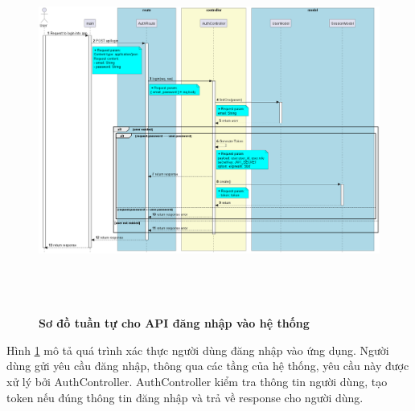 \begin{enumerate}[a)]
\begin{figure}[H]
  \centering
  \includegraphics[width=16cm,height=12cm]{Images/server/sequence/server/login.png}
  \caption[Sơ đồ tuần tự cho API đăng nhập vào hệ thống]{\bfseries \fontsize{12pt}{0pt}
  \selectfont Sơ đồ tuần tự cho API đăng nhập vào hệ thống }
  \label{backend_login} %
\end{figure}
Hình \ref{backend_login}  mô tả quá trình xác thực người dùng đăng nhập vào ứng dụng. Người dùng gửi yêu cầu đăng nhập, thông qua các tầng của hệ thống, yêu cầu này được xử lý bởi AuthController. AuthController kiểm tra thông tin người dùng, tạo token nếu đúng thông tin đăng nhập và trả về response cho người dùng.


\end{enumerate}
